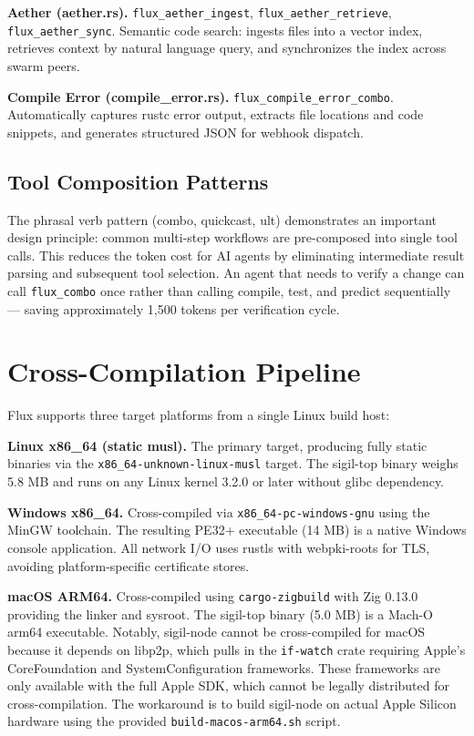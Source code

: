 \documentclass[11pt,a4paper]{article}
\begin{document}
\textbf{Aether (aether.rs).} \texttt{flux\_aether\_ingest}, \texttt{flux\_aether\_retrieve}, \texttt{flux\_aether\_sync}. Semantic code search: ingests files into a vector index, retrieves context by natural language query, and synchronizes the index across swarm peers.

\textbf{Compile Error (compile\_error.rs).} \texttt{flux\_compile\_error\_combo}. Automatically captures rustc error output, extracts file locations and code snippets, and generates structured JSON for webhook dispatch.

\subsection{Tool Composition Patterns}

The phrasal verb pattern (combo, quickcast, ult) demonstrates an important design principle: common multi-step workflows are pre-composed into single tool calls. This reduces the token cost for AI agents by eliminating intermediate result parsing and subsequent tool selection. An agent that needs to verify a change can call \texttt{flux\_combo} once rather than calling compile, test, and predict sequentially — saving approximately 1,500 tokens per verification cycle.

\section{Cross-Compilation Pipeline}

Flux supports three target platforms from a single Linux build host:

\textbf{Linux x86\_64 (static musl).} The primary target, producing fully static binaries via the \texttt{x86\_64-unknown-linux-musl} target. The sigil-top binary weighs 5.8 MB and runs on any Linux kernel 3.2.0 or later without glibc dependency.

\textbf{Windows x86\_64.} Cross-compiled via \texttt{x86\_64-pc-windows-gnu} using the MinGW toolchain. The resulting PE32+ executable (14 MB) is a native Windows console application. All network I/O uses rustls with webpki-roots for TLS, avoiding platform-specific certificate stores.

\textbf{macOS ARM64.} Cross-compiled using \texttt{cargo-zigbuild} with Zig 0.13.0 providing the linker and sysroot. The sigil-top binary (5.0 MB) is a Mach-O arm64 executable. Notably, sigil-node cannot be cross-compiled for macOS because it depends on libp2p, which pulls in the \texttt{if-watch} crate requiring Apple's CoreFoundation and SystemConfiguration frameworks. These frameworks are only available with the full Apple SDK, which cannot be legally distributed for cross-compilation. The workaround is to build sigil-node on actual Apple Silicon hardware using the provided \texttt{build-macos-arm64.sh} script.
\end{document}

